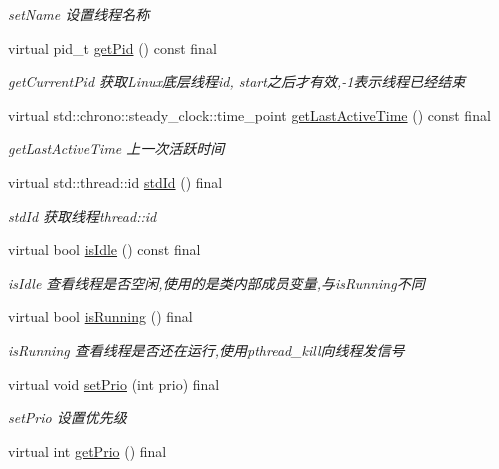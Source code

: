 \begin{DoxyCompactItemize}
\begin{DoxyCompactList}\small\item\em set\+Name 设置线程名称 \end{DoxyCompactList}\item 
virtual pid\+\_\+t \hyperlink{classThread_ad7fd4dfa0edff93d118b2edf5ab7be2c}{get\+Pid} () const final
\begin{DoxyCompactList}\small\item\em get\+Current\+Pid 获取\+Linux底层线程id, start之后才有效,-\/1表示线程已经结束 \end{DoxyCompactList}\item 
virtual std\+::chrono\+::steady\+\_\+clock\+::time\+\_\+point \hyperlink{classThread_a23de6830557bdbe18a0baf17db58aec6}{get\+Last\+Active\+Time} () const final
\begin{DoxyCompactList}\small\item\em get\+Last\+Active\+Time 上一次活跃时间 \end{DoxyCompactList}\item 
virtual std\+::thread\+::id \hyperlink{classThread_a231da16ab1825ee982c4aa43f78c1b22}{std\+Id} () final
\begin{DoxyCompactList}\small\item\em std\+Id 获取线程thread\+::id \end{DoxyCompactList}\item 
virtual bool \hyperlink{classThread_acb6c590deecea4778a855459f080060a}{is\+Idle} () const final
\begin{DoxyCompactList}\small\item\em is\+Idle 查看线程是否空闲,使用的是类内部成员变量,与is\+Running不同 \end{DoxyCompactList}\item 
virtual bool \hyperlink{classThread_ab4c718f3ca4aa7514c7e89e38f9da894}{is\+Running} () final
\begin{DoxyCompactList}\small\item\em is\+Running 查看线程是否还在运行,使用pthread\+\_\+kill向线程发信号 \end{DoxyCompactList}\item 
virtual void \hyperlink{classThread_a96661f80f5fbd26042a24eafd675cd91}{set\+Prio} (int prio) final
\begin{DoxyCompactList}\small\item\em set\+Prio 设置优先级 \end{DoxyCompactList}\item 
virtual int \hyperlink{classThread_a712ab58b9e89f458427b213b1197a666}{get\+Prio} () final

\end{DoxyCompactItemize}
